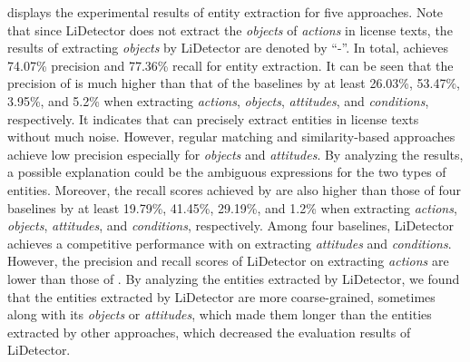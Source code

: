  displays the experimental results of entity extraction for five approaches. Note that since LiDetector does not extract the \textit{objects} of \textit{actions} in license texts, the results of extracting \textit{objects} by LiDetector are denoted by ``-''. In total, \tool achieves 74.07\% precision and 77.36\% recall for entity extraction. It can be seen that the precision of \tool is much higher than that of the baselines by at least 26.03\%, 53.47\%, 3.95\%, and 5.2\% when extracting \textit{actions}, \textit{objects}, \textit{attitudes}, and \textit{conditions}, respectively. It indicates that \tool can precisely extract entities in license texts without much noise. However, regular matching and similarity-based approaches achieve low precision especially for \textit{objects} and \textit{attitudes}. By analyzing the results, a possible explanation could be the ambiguous expressions for the two types of entities. 
Moreover, the recall scores achieved by \tool are also higher than those of four baselines by at least 19.79\%, 41.45\%, 29.19\%, and 1.2\% when extracting \textit{actions}, \textit{objects}, \textit{attitudes}, and \textit{conditions}, respectively. %
Among four baselines, LiDetector achieves a competitive performance with \tool on extracting \textit{attitudes} and \textit{conditions}. 
However, the precision and recall scores of LiDetector on extracting \textit{actions} are lower than those of \tool. By analyzing the entities extracted by LiDetector, we found that {the entities extracted by LiDetector are more coarse-grained, sometimes along with its \textit{objects} or \textit{attitudes}, which made them longer than the entities extracted by other approaches, which decreased the evaluation results of LiDetector.}

